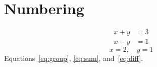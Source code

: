 \documentclass{article}\listfiles\usepackage{amsmath}\numberwithin{equation}{section}
\begin{document}
\section{Numbering}
\begin{subequations}\label{eq:group}\begin{align}x+y&=3\label{eq:sum}\\x-y&=1\label{eq:diff}\end{align}\end{subequations}
\begin{equation}x=2,\quad y=1\end{equation}
Equations~\eqref{eq:group}, \eqref{eq:sum}, and~\eqref{eq:diff}.
\end{document}
